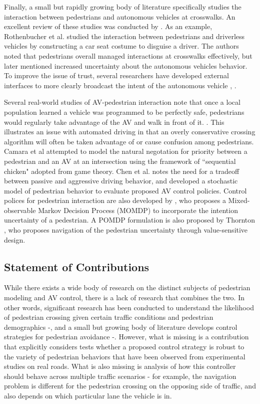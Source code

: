 \documentclass[letterpaper, 10 pt, conference]{ieeeconf}  %
\begin{document}
Finally, a small but rapidly growing body of literature specifically studies the interaction between pedestrians and autonomous vehicles at crosswalks. An excellent review of these studies was conducted by \cite{Rasouli}. As an example, Rothenbucher et al. \cite{Rothenbucher2016} studied the interaction between pedestrians and driverless vehicles by constructing a car seat costume to disguise a driver. The authors noted that pedestrians overall managed interactions at crosswalks effectively, but later mentioned increased uncertainty about the autonomous vehicles behavior. To improve the issue of trust, several researchers have developed external interfaces to more clearly broadcast the intent of the autonomous vehicle \cite{Matthews}, \cite{Lagstrom2015}. 

Several real-world studies of AV-pedestrian interaction note that once a local population learned a vehicle was programmed to be perfectly safe, pedestrians would regularly take advantage of the AV and walk in front of it. \cite{Madigan}. This illustrates an issue with automated driving in that an overly conservative crossing algorithm will often be taken advantage of or cause confusion among pedestrians. Camara et al \cite{Camara2018} attempted to model the natural negotation for priority between a pedestrian and an AV at an intersection using the framework of ``sequential chicken" adopted from game theory. Chen et al. \cite{Chen} notes the need for a tradeoff between passive and aggressive driving behavior, and developed a stochastic model of pedestrian behavior to evaluate proposed AV control policies. Control polices for pedestrian interaction are also developed by \cite{Bandyopadhyay}, who proposes a Mixed-observable Markov Decision Process (MOMDP) to incorporate the intention uncertainty of a pedestrian. A POMDP formulation is also proposed by Thornton \cite{Thornton2018}, who proposes navigation of the pedestrian uncertainty through value-sensitive design. 

\subsection{Statement of Contributions}
While there exists a wide body of research on the distinct subjects of pedestrian modeling and AV control, there is a lack of research that combines the two. In other words, significant research has been conducted to understand the likelihood of pedestrian crossing given certain traffic conditions and pedestrian demographics \cite{Schroeder2011} -\cite{Lee2005}, and a small but growing body of literature develops control strategies for pedestrian avoidance \cite{Bandyopadhyay}-\cite{Thornton2018}. However, what is missing is a contribution that explicitly considers tests whether a proposed control strategy is robust to the variety of pedestrian behaviors that have been observed from experimental studies on real roads. What is also missing is analysis of how this controller should behave across multiple traffic scenarios - for example, the navigation problem is different for the pedestrian crossing on the opposing side of traffic, and also depends on which particular lane the vehicle is in.   
\end{document}
